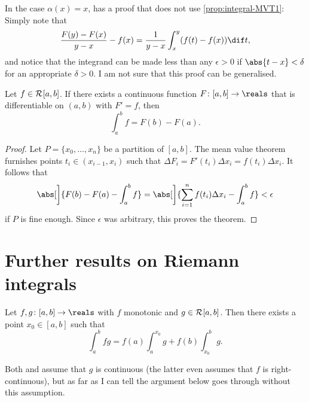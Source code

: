 \documentclass[article, a4paper, 11pt, oneside]{memoir}
\numberwithin{equation}{chapter}
\begin{document}
\begin{remark}
    In the case $\alpha(x) = x$,  has a proof that does not use \cref{prop:integral-MVT1}: Simply note that
    \begin{equation*}
        \frac{F(y)-F(x)}{y-x} - f(x)
            = \frac{1}{y-x} \int_x^y (f(t) - f(x)) \dif t,
    \end{equation*}
    and notice that the integrand can be made less than any $\epsilon > 0$ if $\abs{t-x} < \delta$ for an appropriate $\delta > 0$. I am not sure that this proof can be generalised.
\end{remark}


\begin{theorem}
    Let $f \in \mathcal{R}_{}[a,b]$. If there exists a continuous function $F \colon [a,b] \to \reals$ that is differentiable on $(a,b)$ with $F' = f$, then
    \begin{equation*}
        \int_a^b f
            = F(b) - F(a).
    \end{equation*}
\end{theorem}

\begin{proof}
    Let $P = \{x_0, \ldots, x_n\}$ be a partition of $[a,b]$. The mean value theorem furnishes points $t_i \in (x_{i-1}, x_i)$ such that $\Delta F_i = F'(t_i) \Delta x_i = f(t_i) \Delta x_i$. It follows that
    \begin{equation*}
        \abs[\bigg]{ F(b) - F(a) - \int_a^b f }
            = \abs[\bigg]{ \sum_{i=1}^n f(t_i)\Delta x_i - \int_a^b f }
            < \epsilon
    \end{equation*}
    if $P$ is fine enough. Since $\epsilon$ was arbitrary, this proves the theorem.
\end{proof}


\section{Further results on Riemann integrals}

\begin{corollary}
    Let $f,g \colon [a,b] \to \reals$ with $f$ monotonic and $g \in \mathcal{R}_{}[a,b]$. Then there exists a point $x_0 \in [a,b]$ such that
    \begin{equation*}
        \int_a^b fg
            = f(a) \int_a^{x_0} g + f(b) \int_{x_0}^b g.
    \end{equation*}
\end{corollary}
%
Both \textcite[Theorem~7.37]{apostolanalysis} and \textcite[Lemma~8.41]{folland2007} assume that $g$ is continuous (the latter even assumes that $f$ is right-continuous), but as far as I can tell the argument below goes through without this assumption.
\end{document}
